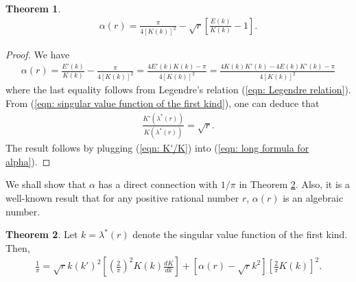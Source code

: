 \documentclass[11pt]{amsart}
\theoremstyle{definition}
\newtheorem{theorem}{Theorem}[section]
\numberwithin{theorem}{section}
\begin{document}
\begin{theorem}\label{formula for alpha}
    \begin{align*}
        \alpha\left(r\right)=\frac{\pi}{4\left[K\left(k\right)\right]^2}-\sqrt{r}\left[\frac{E\left(k\right)}{K\left(k\right)}-1\right].
    \end{align*}
\end{theorem}
\begin{proof}
We have \begin{align}\label{eqn: long formula for alpha}
    \alpha \left( r \right)=\frac{{E}'\left( k \right)}{K\left( k \right)}-\frac{\pi }{4{{\left[ K\left( k \right) \right]}^{2}}}=\frac{4{E}'\left( k \right)K\left( k \right)-\pi }{4{{\left[ K\left( k \right) \right]}^{2}}}=\frac{4K\left( k \right){K}'\left( k \right)-4E\left( k \right){K}'\left( k \right)-\pi }{4{{\left[ K\left( k \right) \right]}^{2}}}
\end{align}
where the last equality follows from Legendre's relation (\ref{eqn: Legendre relation}). From (\ref{eqn: singular value function of the first kind}), one can deduce that \begin{align}\label{eqn: K'/K}
    \frac{K'\left(\lambda^\ast\left(r\right)\right)}{K\left(\lambda^\ast\left(r\right)\right)}=\sqrt{r}.
\end{align}
The result follows by plugging (\ref{eqn: K'/K}) into (\ref{eqn: long formula for alpha}).
\end{proof}
We shall show that $\alpha$ has a direct connection with $1/\pi$ in Theorem \ref{theorem alpha connection with 1/pi}. Also, it is a well-known result that for any positive rational number $r$, $\alpha\left(r\right)$ is an algebraic number.
\begin{theorem}\label{theorem alpha connection with 1/pi} Let $k=\lambda^\ast\left(r\right)$ denote the singular value function of the first kind. Then,
    \begin{align*}
        \frac{1}{\pi}=\sqrt{r}k\left(k'\right)^2\left[\left(\frac{2}{\pi}\right)^2 K\left(k\right)\frac{dK}{dk}\right]+\left[\alpha\left(r\right)-\sqrt{r}k^2\right]\left[\frac{2}{\pi}K\left(k\right)\right]^2.
    \end{align*}
\end{theorem}
\end{document}
